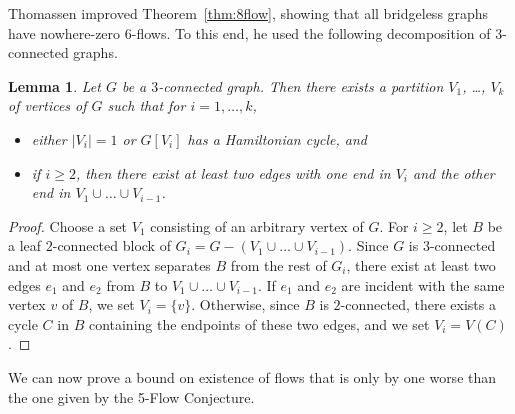 \documentclass[12pt,twoside,openright,a4paper]{book}
\newtheorem{lemma}[theorem]{Lemma}
\begin{document}
Thomassen improved Theorem~\ref{thm:8flow}, showing that all bridgeless graphs have nowhere-zero $6$-flows.   To this end, he used
the following decomposition of $3$-connected graphs.
\begin{lemma}\label{lemma-descent}
Let $G$ be a $3$-connected graph.  Then there
exists a partition $V_1$, \ldots, $V_k$ of vertices of $G$ such that for $i=1, \ldots, k$,
\begin{itemize}
\item either $|V_i|=1$ or $G[V_i]$ has a Hamiltonian cycle, and
\item if $i\ge 2$, then there exist at least two edges with one end in $V_i$ and the other end in $V_1\cup\ldots\cup V_{i-1}$.
\end{itemize}
\end{lemma}
\begin{proof}
Choose a set $V_1$ consisting of an arbitrary vertex of $G$.  For $i\ge 2$, let $B$ be a leaf $2$-connected block of $G_i=G-(V_1\cup \ldots\cup V_{i-1})$.
Since $G$ is $3$-connected and at most one vertex separates $B$ from the rest of $G_i$, there exist at least two edges $e_1$ and $e_2$ from $B$ to
$V_1\cup \ldots\cup V_{i-1}$.  If $e_1$ and $e_2$ are incident with the same vertex $v$ of $B$, we set $V_i=\{v\}$.
Otherwise, since $B$ is $2$-connected, there exists a cycle $C$ in $B$ containing the endpoints of these two edges,
and we set $V_i=V(C)$.
\end{proof}

We can now prove a bound on existence of flows that is only by one worse than the one given by the 5-Flow Conjecture.
\end{document}
